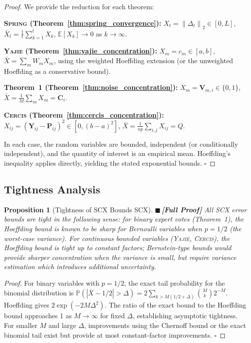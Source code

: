 \documentclass[12pt,a4paper]{article}
\newtheorem{proposition}[theorem]{Proposition}
\theoremstyle{definition}
\newcommand{\rigorFull}{{\color{rigorcolor}$\blacksquare$\,\textbf{[Full Proof]}}}
\newcommand{\Yajie}{\textsc{Yajie}}
\newcommand{\Spring}{\textsc{Spring}}
\newcommand{\Cercis}{\textsc{Cercis}}
\newcommand{\SCX}{\textsc{SCX}}
\newcommand{\E}{\mathbb{E}}
\newcommand{\Pbb}{\mathbb{P}}
\newcommand{\norm}[1]{\left\lVert#1\right\rVert}
\newcommand{\mat}[1]{\mathbf{#1}}
\begin{document}
\begin{proof}
We provide the reduction for each theorem:

\textbf{\Spring{} (Theorem~\ref{thm:spring_convergence}):} 
$X_t = \norm{\Delta_t}_2 \in [0, L]$, $\bar{X}_t = \frac{1}{t}\sum_{k=1}^{t} X_k$, 
$\E[X_k] \to 0$ as $k \to \infty$.

\textbf{\Yajie{} (Theorem~\ref{thm:yajie_concentration}):} 
$X_m = c_m \in [a, b]$, $\bar{X} = \sum_m W_m X_m$, 
using the weighted Hoeffding extension (or the unweighted Hoeffding as a conservative bound).

\textbf{Theorem~1 (Theorem~\ref{thm:noise_concentration}):} 
$X_m = \mat{V}_{m,i} \in \{0,1\}$, $\bar{X} = \frac{1}{M}\sum_m X_m = \mat{C}_i$.

\textbf{\Cercis{} (Theorem~\ref{thm:cercis_concentration}):} 
$X_{ij} = (\mat{Y}_{ij} - \mat{P}_{ij})^2 \in [0, (b-a)^2]$, 
$\bar{X} = \frac{1}{np}\sum_{i,j} X_{ij} = Q$.

In each case, the random variables are bounded, independent (or conditionally independent),
and the quantity of interest is an empirical mean. Hoeffding's inequality applies directly,
yielding the stated exponential bounds. \hfill $\square$
\end{proof}

\subsection{Tightness Analysis }

\begin{proposition}[Tightness of SCX Bounds SCX]\label{prop:tightness}
\rigorFull
All \SCX{} error bounds are tight in the following sense: for binary expert votes 
(Theorem~1), the Hoeffding bound is known to be sharp for Bernoulli variables when 
$p = 1/2$ (the worst-case variance). For continuous bounded variables (\Yajie{}, 
\Cercis{}), the Hoeffding bound is tight up to constant factors; Bernstein-type 
bounds would provide sharper concentration when the variance is small, but require 
variance estimation which introduces additional uncertainty.
\end{proposition}

\begin{proof}
For binary variables with $p = 1/2$, the exact tail probability for the binomial 
distribution is $\Pbb(|\bar{X} - 1/2| > \Delta) = 2\sum_{k > M(1/2+\Delta)} \binom{M}{k} 2^{-M}$.
Hoeffding gives $2\exp(-2M\Delta^2)$. The ratio of the exact bound to the Hoeffding 
bound approaches 1 as $M \to \infty$ for fixed $\Delta$, establishing asymptotic tightness.
For smaller $M$ and large $\Delta$, improvements using the Chernoff bound or the exact
binomial tail exist but provide at most constant-factor improvements. \hfill $\square$
\end{proof}
\end{document}
